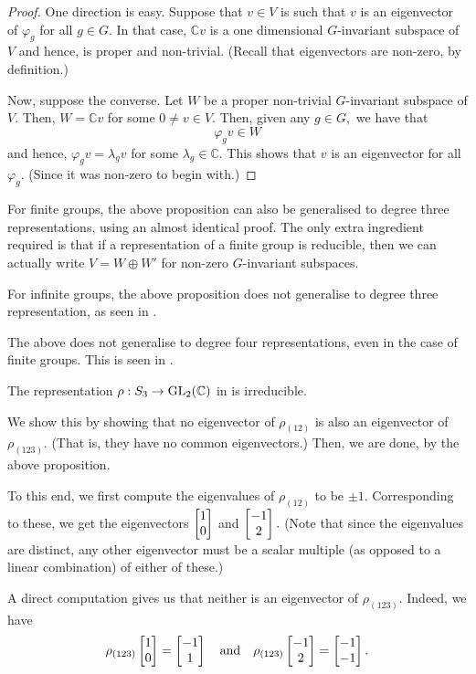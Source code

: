 \begin{proof} 
	One direction is easy. Suppose that $v \in V$ is such that $v$ is an eigenvector of $\varphi_g$ for all $g \in G.$ In that case, $\mathbb{C}v$ is a one dimensional $G$-invariant subspace of $V$ and hence, is proper and non-trivial. (Recall that eigenvectors are non-zero, by definition.)

	Now, suppose the converse. Let $W$ be a proper non-trivial $G$-invariant subspace of $V.$ Then, $W = \mathbb{C}v$ for some $0 \neq v \in V.$ Then, given any $g \in G,$ we have that
	\begin{equation*} 
		\varphi_gv \in W
	\end{equation*}
	and hence, $\varphi_gv = \lambda_g v$ for some $\lambda_g \in \mathbb{C}.$ This shows that $v$ is an eigenvector for all $\varphi_g.$ (Since it was non-zero to begin with.)
\end{proof}

\begin{rem}
	For finite groups, the above proposition can also be generalised to degree three representations, using an almost identical proof. The only extra ingredient required is that if a representation of a finite group is reducible, then we can actually write $V = W \oplus W'$ for non-zero $G$-invariant subspaces.

	For infinite groups, the above proposition does not generalise to degree three representation, as seen in .

	The above does not generalise to degree four representations, even in the case of finite groups. This is seen in .
\end{rem}

\begin{ex} \label{ex:showingS3GL2Crhoisirred}
	The representation $\rho:S_3 \to \operatorname{GL}_2(\mathbb{C})$ in  is irreducible. 

	We show this by showing that no eigenvector of $\rho_{(12)}$ is also an eigenvector of $\rho_{(123)}.$ (That is, they have no common eigenvectors.) Then, we are done, by the above proposition.

	To this end, we first compute the eigenvalues of $\rho_{(12)}$ to be $\pm 1.$ Corresponding to these, we get the eigenvectors $\begin{bmatrix} 1 \\ 0 \end{bmatrix}$ and $\begin{bmatrix} -1 \\ 2 \end{bmatrix}.$ (Note that since the eigenvalues are distinct, any other eigenvector must be a scalar multiple (as opposed to a linear combination) of either of these.)

	A direct computation gives us that neither is an eigenvector of $\rho_{(123)}.$ Indeed, we have
	\begin{equation*} 
		\rho_{(123)}\begin{bmatrix} 1 \\ 0 \end{bmatrix} = \begin{bmatrix} -1 \\ 1 \end{bmatrix} \quad\text{and}\quad \rho_{(123)}\begin{bmatrix} -1 \\ 2 \end{bmatrix} = \begin{bmatrix} -1 \\ -1 \end{bmatrix}.
	\end{equation*}
\end{ex}

